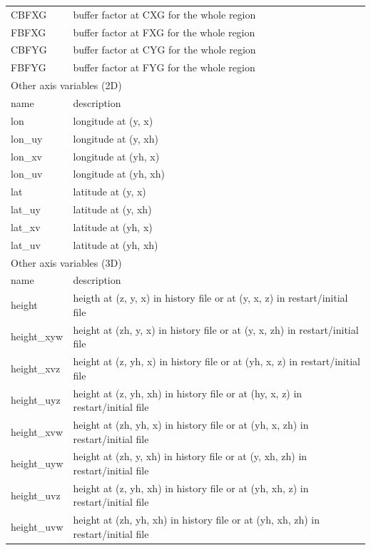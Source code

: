 \begin{longtable}{l|l}
CBFXG & buffer factor at CXG for the whole region \\
FBFXG & buffer factor at FXG for the whole region \\
CBFYG & buffer factor at CYG for the whole region \\
FBFYG & buffer factor at FYG for the whole region \\
\hline
\multicolumn{2}{l}{Other axis variables (2D)}\\ \hline
name & description \\ \hline \hline
lon     & longitude at (y, x) \\
lon\_uy & longitude at (y, xh) \\
lon\_xv & longitude at (yh, x) \\
lon\_uv & longitude at (yh, xh) \\
lat     & latitude  at (y, x) \\
lat\_uy & latitude  at (y, xh) \\
lat\_xv & latitude  at (yh, x) \\
lat\_uv & latitude  at (yh, xh) \\
\hline
\multicolumn{2}{l}{Other axis variables (3D)}\\ \hline
name & description \\ \hline \hline
height      & heigth at (z, y, x)    in history file or at (y, x, z)    in restart/initial file\\
height\_xyw & height at (zh, y, x)   in history file or at (y, x, zh)   in restart/initial file\\
height\_xvz & height at (z, yh, x)   in history file or at (yh, x, z)   in restart/initial file\\
height\_uyz & height at (z, yh, xh)  in history file or at (hy, x, z)   in restart/initial file\\
height\_xvw & height at (zh, yh, x)  in history file or at (yh, x, zh)  in restart/initial file\\
height\_uyw & height at (zh, y, xh)  in history file or at (y, xh, zh)  in restart/initial file\\
height\_uvz & height at (z, yh, xh)  in history file or at (yh, xh, z)  in restart/initial file\\
height\_uvw & height at (zh, yh, xh) in history file or at (yh, xh, zh) in restart/initial file\\
\end{longtable}



